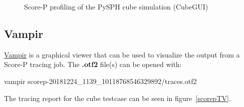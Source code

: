 \documentclass[a4paper,pagesize,12pt]{scrbook}
\begin{document}
\begin{figure}[!ht]
\captionsetup[subfigure]{labelformat=empty}
\caption{Score-P profiling of the PySPH cube simulation (CubeGUI)}
\label{scorepPCube}
  \hfill
\end{figure}%
\vspace{-1cm}
\begin{figure}[!ht]
\captionsetup{labelformat=empty}
\captionsetup[subfigure]{labelformat=empty}
  \hfill
\end{figure}

\vspace{2cm}
\subsection{Vampir}
\href{https://www.vi-hps.org/tools/vampir.html}{Vampir}
is a graphical viewer that can be used to visualize the output from a Score-P
tracing job. The \textbf{.otf2} file(s) can be opened with:
\begin{python}
    vampir scorep-20181224_1139_10118768546329892/traces.otf2
\end{python}

The tracing report for the cube testcase can be seen in figure~\ref{scorepTV}.
\end{document}
